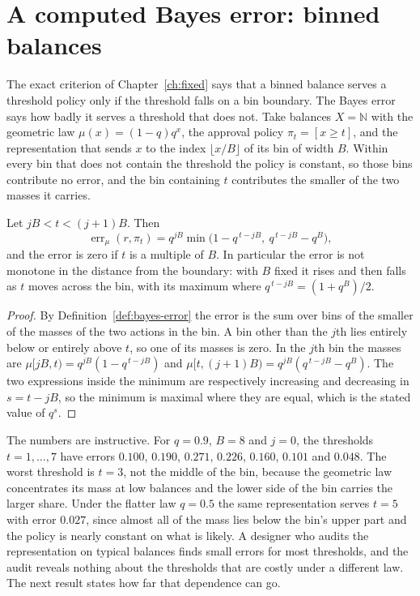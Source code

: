 \section{A computed Bayes error: binned balances}\label{sec:binned}

The exact criterion of Chapter~\ref{ch:fixed} says that a binned balance serves a threshold policy only if the threshold falls on a bin boundary. The Bayes error says how badly it serves a threshold that does not. Take balances $X=\mathbb N$ with the geometric law $\mu(x)=(1-q)q^{x}$, the approval policy $\pi_t=[x\ge t]$, and the representation that sends $x$ to the index $\lfloor x/B\rfloor$ of its bin of width $B$. Within every bin that does not contain the threshold the policy is constant, so those bins contribute no error, and the bin containing $t$ contributes the smaller of the two masses it carries.

\begin{newresult}\label{prop:binned-error}
Let $jB<t<(j+1)B$. Then
\[
\operatorname{err}_\mu(r,\pi_t)=q^{jB}\min\bigl(1-q^{\,t-jB},\ q^{\,t-jB}-q^{B}\bigr),
\]
and the error is zero if $t$ is a multiple of $B$. In particular the error is not monotone in the distance from the boundary: with $B$ fixed it rises and then falls as $t$ moves across the bin, with its maximum where $q^{\,t-jB}=(1+q^{B})/2$.
\end{newresult}
\begin{proof}
By Definition~\ref{def:bayes-error} the error is the sum over bins of the smaller of the masses of the two actions in the bin. A bin other than the $j$th lies entirely below or entirely above $t$, so one of its masses is zero. In the $j$th bin the masses are $\mu[jB,t)=q^{jB}(1-q^{\,t-jB})$ and $\mu[t,(j+1)B)=q^{jB}(q^{\,t-jB}-q^{B})$. The two expressions inside the minimum are respectively increasing and decreasing in $s=t-jB$, so the minimum is maximal where they are equal, which is the stated value of $q^{s}$.
\end{proof}

The numbers are instructive. For $q=0.9$, $B=8$ and $j=0$, the thresholds $t=1,\dots,7$ have errors $0.100$, $0.190$, $0.271$, $0.226$, $0.160$, $0.101$ and $0.048$. The worst threshold is $t=3$, not the middle of the bin, because the geometric law concentrates its mass at low balances and the lower side of the bin carries the larger share. Under the flatter law $q=0.5$ the same representation serves $t=5$ with error $0.027$, since almost all of the mass lies below the bin's upper part and the policy is nearly constant on what is likely. A designer who audits the representation on typical balances finds small errors for most thresholds, and the audit reveals nothing about the thresholds that are costly under a different law. The next result states how far that dependence can go.

